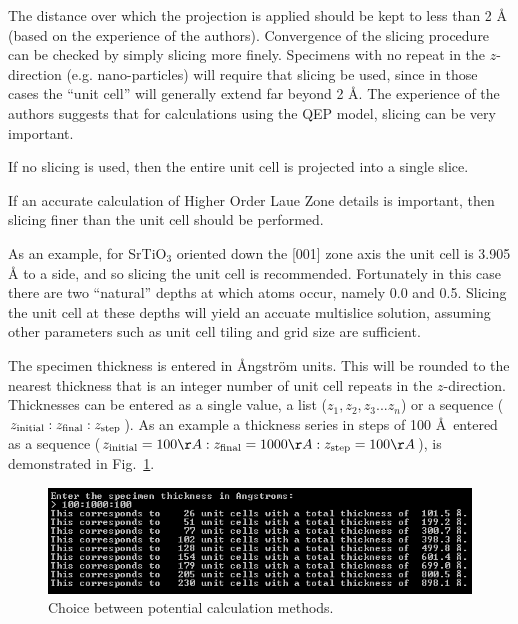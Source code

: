 \documentclass[12pt,a4paper]{article}
\begin{document}
The distance over which the projection is applied should be kept to less than 2 {\AA} (based on the experience of the authors).
Convergence of the slicing procedure can be checked by simply slicing more finely.
Specimens with no repeat in the $z$-direction (e.g. nano-particles) will require that slicing be used, since in those cases the ``unit cell'' will generally extend far beyond 2 \AA{}.
The experience of the authors suggests that for calculations using the QEP model, slicing can be very important.

If no slicing is used, then the entire unit cell is projected into a single slice.

If an accurate calculation of Higher Order Laue Zone details is important, then slicing finer than the unit cell should be performed.


As an example, for SrTiO$_3$ oriented down the [001] zone axis the unit cell is 3.905 \AA{} to a side, and so slicing the unit cell is recommended.
Fortunately in this case there are two ``natural'' depths at which atoms occur, namely 0.0 and 0.5.
Slicing the unit cell at these depths will yield an accuate multislice solution, assuming other parameters such as unit cell tiling and grid size are sufficient.

The specimen thickness is entered in \AA{}ngstr\"om units.
This will be rounded to the nearest thickness that is an integer number of unit cell repeats in the $z$-direction.
Thicknesses can be entered as a single value, a list
($ z_1,z_2,z_3...z_n $)
or a sequence
($ z_{\rm initial}:z_{\rm final}:z_{\rm step}  $).
As an example a thickness series in steps of 100 \AA\, entered as a sequence ($ z_{\rm initial}=100\AA:z_{\rm final}=1000\AA:z_{\rm step}=100\AA  $), is demonstrated in Fig.~\ref{fig:thickness_series}.

\begin{figure}[!h]
	\begin{center}
		\includegraphics[scale=1.0]{thickness_series.png}
		\caption{Choice between potential calculation methods.}
		\label{fig:thickness_series}
	\end{center}
\end{figure}
\end{document}
